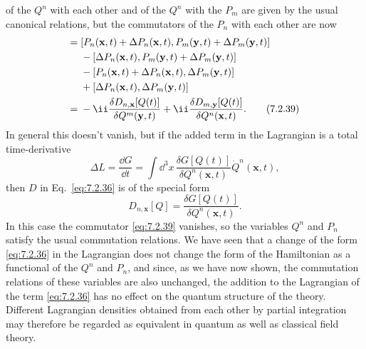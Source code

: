 of the $Q^n$ with each other and of the $Q^n$ with the $P_m$ are given by the
usual canonical relations, but the commutators of the $P_n$ with each other
are now
\begin{align}
[P_n(\mathbf{x},t),P_m(\mathbf{y},t)]
={}&[P_n(\mathbf{x},t)+\Delta P_n(\mathbf{x},t),
P_m(\mathbf{y},t)+\Delta P_m(\mathbf{y},t)]
\notag\\
&-[\Delta P_n(\mathbf{x},t),P_m(\mathbf{y},t)+\Delta P_m(\mathbf{y},t)]
\notag\\
&-[P_n(\mathbf{x},t)+\Delta P_n(\mathbf{x},t),\Delta P_m(\mathbf{y},t)]
\notag\\
&+[\Delta P_n(\mathbf{x},t),\Delta P_m(\mathbf{y},t)]
\notag\\
={}&-\ii\frac{\delta D_{n,\mathbf{x}}[Q(t)]}{\delta Q^m(\mathbf{y},t)}
+\ii\frac{\delta D_{m,\mathbf{y}}[Q(t)]}{\delta Q^n(\mathbf{x},t)}.
\tag{7.2.39}\label{eq:7.2.39}
\end{align}
In general this doesn't vanish, but if the added term in the Lagrangian is
a total time-derivative
\begin{equation}
\Delta L=\frac{\dd G}{\dd t}=\int \dd^3x\,
\frac{\delta G[Q(t)]}{\delta Q^n(\mathbf{x},t)}\dot Q^n(\mathbf{x},t),
\tag{7.2.40}\label{eq:7.2.40}
\end{equation}
then $D$ in Eq.~\eqref{eq:7.2.36} is of the special form
\begin{equation}
D_{n,\mathbf{x}}[Q]=\frac{\delta G[Q(t)]}{\delta Q^n(\mathbf{x},t)}.
\tag{7.2.41}\label{eq:7.2.41}
\end{equation}
In this case the commutator \eqref{eq:7.2.39} vanishes, so the variables $Q^n$ and
$P_n$ satisfy the usual commutation relations. We have seen that a change
of the form \eqref{eq:7.2.36} in the Lagrangian does not change the form of the
Hamiltonian as a functional of the $Q^n$ and $P_n$, and since, as we have now
shown, the commutation relations of these variables are also unchanged,
the addition to the Lagrangian of the term \eqref{eq:7.2.36} has no effect on the
quantum structure of the theory. Different Lagrangian densities obtained
from each other by partial integration may therefore be regarded as
equivalent in quantum as well as classical field theory.

